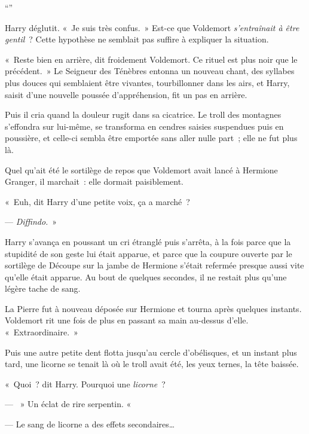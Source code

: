 “”

Harry déglutit. «~Je suis très confus.~» Est-ce que Voldemort \emph{s'entraînait à être gentil}~? Cette hypothèse ne semblait pas suffire à expliquer la situation.

«~Reste bien en arrière, dit froidement Voldemort. Ce rituel est plus noir que le précédent.~» Le Seigneur des Ténèbres entonna un nouveau chant, des syllabes plus douces qui semblaient être vivantes, tourbillonner dans les airs, et Harry, saisit d'une nouvelle poussée d'appréhension, fit un pas en arrière.

Puis il cria quand la douleur rugit dans sa cicatrice. Le troll des montagnes s'effondra sur lui-même, se transforma en cendres saisies suspendues puis en poussière, et celle-ci sembla être emportée sans aller nulle part~; elle ne fut plus là.

Quel qu'ait été le sortilège de repos que Voldemort avait lancé à Hermione Granger, il marchait~: elle dormait paisiblement.

«~Euh, dit Harry d'une petite voix, ça a marché~?

--- \emph{Diffindo.}~»

Harry s'avança en poussant un cri étranglé puis s'arrêta, à la fois parce que la stupidité de son geste lui était apparue, et parce que la coupure ouverte par le sortilège de Découpe sur la jambe de Hermione s'était refermée presque aussi vite qu'elle était apparue. Au bout de quelques secondes, il ne restait plus qu'une légère tache de sang.

La Pierre fut à nouveau déposée sur Hermione et tourna après quelques instants. Voldemort rit une fois de plus en passant sa main au-dessus d'elle. «~Extraordinaire.~»

Puis une autre petite dent flotta jusqu'au cercle d'obélisques, et un instant plus tard, une licorne se tenait là où le troll avait été, les yeux ternes, la tête baissée.

«~Quoi~? dit Harry. Pourquoi une \emph{licorne}~?

--- ~» Un éclat de rire serpentin. «~

--- Le sang de licorne a des effets secondaires…

